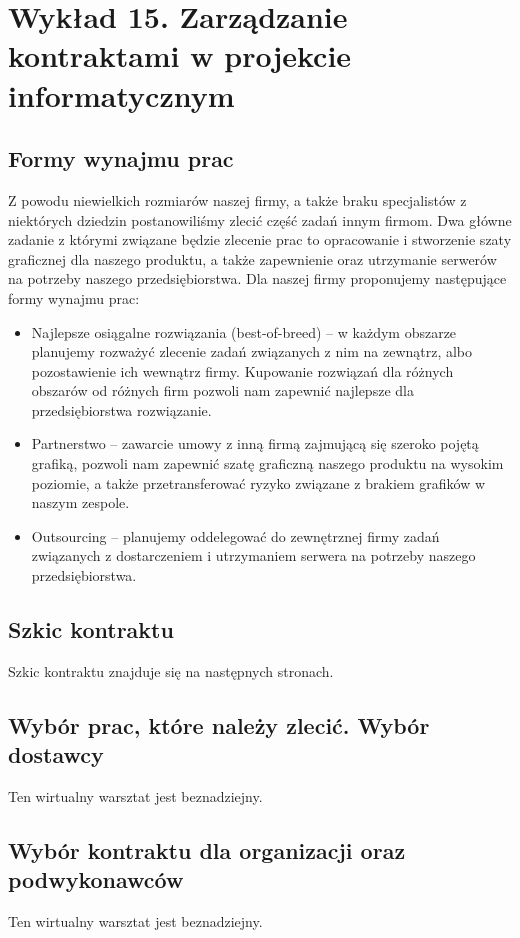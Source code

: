 \chapter{Wykład 15. Zarządzanie kontraktami w projekcie informatycznym}

\section{Formy wynajmu prac}

Z powodu niewielkich rozmiarów naszej firmy, a także braku specjalistów z niektórych dziedzin postanowiliśmy zlecić część zadań innym firmom. Dwa główne zadanie z którymi związane będzie zlecenie prac to opracowanie i stworzenie szaty graficznej dla naszego produktu, a także zapewnienie oraz utrzymanie serwerów na potrzeby naszego przedsiębiorstwa. Dla naszej firmy proponujemy następujące formy wynajmu prac:
\begin{itemize}
\item Najlepsze osiągalne rozwiązania (best-of-breed) – w każdym obszarze planujemy rozważyć zlecenie zadań związanych z nim na zewnątrz, albo pozostawienie ich wewnątrz firmy. Kupowanie rozwiązań dla różnych obszarów od różnych firm pozwoli nam zapewnić najlepsze dla przedsiębiorstwa rozwiązanie.
\item Partnerstwo – zawarcie umowy z inną firmą zajmującą się szeroko pojętą grafiką, pozwoli nam zapewnić szatę graficzną naszego produktu na wysokim poziomie, a także przetransferować ryzyko związane z brakiem grafików w naszym zespole.
\item Outsourcing – planujemy oddelegować do zewnętrznej firmy zadań związanych z dostarczeniem i utrzymaniem serwera na potrzeby naszego przedsiębiorstwa.
\end{itemize}


\section{Szkic kontraktu}

Szkic kontraktu znajduje się na następnych stronach.



\clearpage


\section{Wybór prac, które należy zlecić. Wybór dostawcy}

Ten wirtualny warsztat jest beznadziejny.


\section{Wybór kontraktu dla organizacji oraz podwykonawców}

Ten wirtualny warsztat jest beznadziejny.
